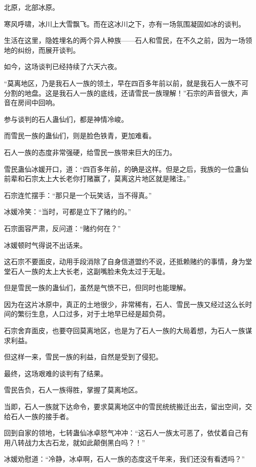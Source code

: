
\begin{this_body}

北原，北部冰原。

寒风呼啸，冰川上大雪飘飞。而在这冰川之下，亦有一场氛围凝固如冰的谈判。

生活在这里，隐姓埋名的两个异人种族——石人和雪民，在不久之前，因为一场领地的纠纷，而展开谈判。

如今，这场谈判已经持续了六天六夜。

“莫离地区，乃是我石人一族的领土，早在四百多年前以前，就是我石人一族不可分割的地盘。这是我石人一族的底线，还请雪民一族理解！”石宗的声音很大，声音在房间中回响。

参与谈判的石人蛊仙们，都是神情冷峻。

而雪民一族的蛊仙们，则是脸色铁青，更加难看。

石人一族的态度非常强硬，给雪民一族带来巨大的压力。

雪民蛊仙冰媛开口，道：“四百多年前，的确是这样。但是之后，我族的一位蛊仙前辈和石宗太上大长老你打赌赢了，莫离这片地区就是赌注。”

石宗连忙摆手：“那只是一个玩笑话，当不得真。”

冰媛冷笑：“当时，可都是立下了赌约的。”

石宗面容严肃，反问道：“赌约何在？”

冰媛顿时气得说不出话来。

这石宗不要面皮，动用手段消除了自身信道盟约不说，还抵赖赌约的事情，身为堂堂石人一族的太上大长老，这副嘴脸未免太过于无耻。

但是雪民一族的蛊仙们，虽然是气愤不已，但同时也能理解。

因为在这片冰原中，真正的土地很少，非常稀有，石人、雪民一族又经过这么长时间的繁衍生息，人口过多，对于土地早已经是超负荷。

石宗舍弃面皮，也要夺回莫离地区，也是为了石人一族的大局着想，为石人一族谋求利益。

但这样一来，雪民一族的利益，自然是受到了侵犯。

最终，这场艰难的谈判有了结果。

雪民告负，石人一族得胜，掌握了莫离地区。

当即，石人一族就下达命令，要求莫离地区中的雪民统统搬迁出去，留出空间，交给石人一族的接手者。

回到自家的领地，七转蛊仙冰卓怒气冲冲：“这石人一族太可恶了，依仗着自己有用八转战力太古石龙，就如此颠倒黑白吗？！”

冰媛劝慰道：“冷静，冰卓啊，石人一族的态度这千年来，我们还没有看透吗？”


\end{this_body}
